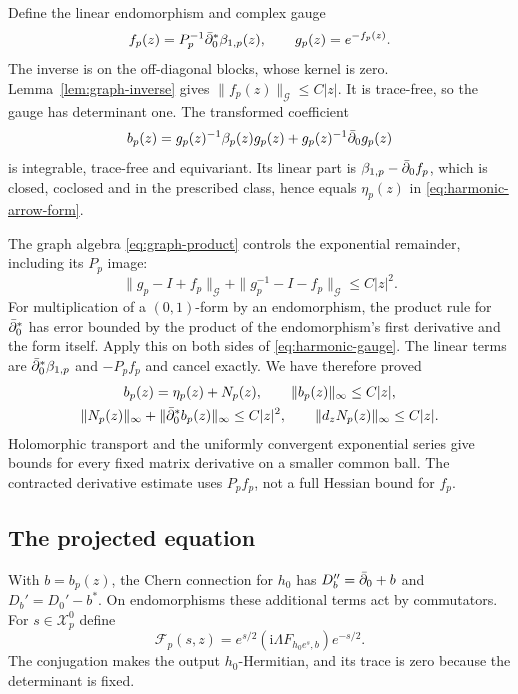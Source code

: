 Define the linear endomorphism and complex gauge
\[
 f_p(z)=P_p^{-1}\bar\partial_0^*\beta_{1,p}(z),
                  \qquad g_p(z)=e^{-f_p(z)}.
\]
The inverse is on the off-diagonal blocks, whose kernel
is zero. Lemma~\ref{lem:graph-inverse} gives
$\|f_p(z)\|_{\mathcal G}\le C|z|$.
It is trace-free, so the gauge has determinant one.
The transformed coefficient
\begin{equation}\label{eq:harmonic-gauge}
 b_p(z)=g_p(z)^{-1}\beta_p(z)g_p(z)
                         +g_p(z)^{-1}\bar\partial_0g_p(z)
\end{equation}
is integrable, trace-free and equivariant. Its linear
part is $\beta_{1,p}-\bar\partial_0f_p$, which is closed,
coclosed and in the prescribed class, hence equals
$\eta_p(z)$ in \eqref{eq:harmonic-arrow-form}.

The graph algebra \eqref{eq:graph-product} controls the
exponential remainder, including its $P_p$ image:
\[
 \|g_p-I+f_p\|_{\mathcal G}
              +\|g_p^{-1}-I-f_p\|_{\mathcal G}\le C|z|^2.
\]
For multiplication of a $(0,1)$-form by an endomorphism,
the product rule for $\bar\partial_0^*$ has error bounded by
the product of the endomorphism's first derivative and
the form itself. Apply this on both sides of
\eqref{eq:harmonic-gauge}. The linear terms are
$\bar\partial_0^*\beta_{1,p}$ and $-P_pf_p$ and cancel exactly.
We have therefore proved
\begin{equation}\label{eq:controlled-harmonic-gauge}
 \begin{gathered}
 b_p(z)=\eta_p(z)+N_p(z),\qquad \|b_p(z)\|_\infty\le C|z|,\\
 \|N_p(z)\|_\infty+\|\bar\partial_0^*b_p(z)\|_\infty\le C|z|^2,
 \qquad\|d_zN_p(z)\|_\infty\le C|z|.
 \end{gathered}
\end{equation}
Holomorphic transport and the uniformly convergent
exponential series give bounds for every fixed matrix
derivative on a smaller common ball. The contracted
derivative estimate uses $P_pf_p$, not a full Hessian
bound for $f_p$.

\subsection{The projected equation}

With $b=b_p(z)$, the Chern connection for $h_0$ has
$D_b''=\bar\partial_0+b$ and $D_b'=D_0'-b^*$.
On endomorphisms these additional terms act by commutators.
For $s\in\mathcal X_p^0$ define
\begin{equation}\label{eq:actual-he-map}
 \mathcal F_p(s,z)=e^{s/2}
       (\mathrm i\Lambda F_{h_0e^s,b})e^{-s/2}.
\end{equation}
The conjugation makes the output $h_0$-Hermitian, and
its trace is zero because the determinant is fixed.

